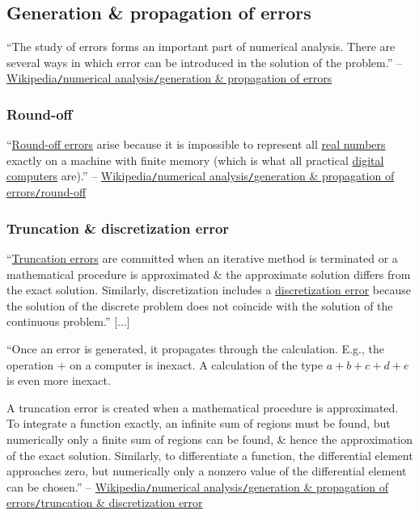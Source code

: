 \documentclass[oneside]{book}
\numberwithin{equation}{section}
\begin{document}
\subsection{Generation \& propagation of errors}
``The study of errors forms an important part of numerical analysis. There are several ways in which error can be introduced in the solution of the problem.'' -- \href{https://en.wikipedia.org/wiki/Numerical_analysis#Generation_and_propagation_of_errors}{Wikipedia\texttt{/}numerical analysis\texttt{/}generation \& propagation of errors}

\subsubsection{Round-off}
``\href{https://en.wikipedia.org/wiki/Round-off_error}{Round-off errors} arise because it is impossible to represent all \href{https://en.wikipedia.org/wiki/Real_number}{real numbers} exactly on a machine with finite memory (which is what all practical \href{https://en.wikipedia.org/wiki/Digital_computer}{digital computers} are).'' -- \href{https://en.wikipedia.org/wiki/Numerical_analysis#Round-off}{Wikipedia\texttt{/}numerical analysis\texttt{/}generation \& propagation of errors\texttt{/}round-off}

\subsubsection{Truncation \& discretization error}
``\href{https://en.wikipedia.org/wiki/Truncation_error}{Truncation errors} are committed when an iterative method is terminated or a mathematical procedure is approximated \& the approximate solution differs from the exact solution. Similarly, discretization includes a \href{https://en.wikipedia.org/wiki/Discretization_error}{discretization error} because the solution of the discrete problem does not coincide with the solution of the continuous problem.'' [$\ldots$]

``Once an error is generated, it propagates through the calculation. E.g., the operation $+$ on a computer is inexact. A calculation of the type $a + b + c + d + e$ is even more inexact.

A truncation error is created when a mathematical procedure is approximated. To integrate a function exactly, an infinite sum of regions must be found, but numerically only a finite sum of regions can be found, \& hence the approximation of the exact solution. Similarly, to differentiate a function, the differential element approaches zero, but numerically only a nonzero value of the differential element can be chosen.'' -- \href{https://en.wikipedia.org/wiki/Numerical_analysis#Truncation_and_discretization_error}{Wikipedia\texttt{/}numerical analysis\texttt{/}generation \& propagation of errors\texttt{/}truncation \& discretization error}
\end{document}
